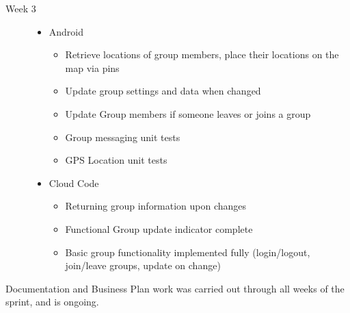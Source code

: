 \documentclass[11pt]{article}
\begin{document}
\begin{description}
  \item[Week 3] \hfill
		\begin{itemize}
		\item Android
		\begin{itemize}
			\item Retrieve locations of group members, place their locations on the map via pins
			\item Update group settings and data when changed
			\item Update Group members if someone leaves or joins a group
			\item Group messaging unit tests
			\item GPS Location unit tests
		\end{itemize}
		\item Cloud Code
		\begin{itemize}
			\item Returning group information upon changes
			\item Functional Group update indicator complete
			\item Basic group functionality implemented fully (login/logout, join/leave groups, update on change)
		\end{itemize}
	\end{itemize}
\end{description}

Documentation and Business Plan work was carried out through all weeks of the sprint, and is ongoing.\\
\end{document}
